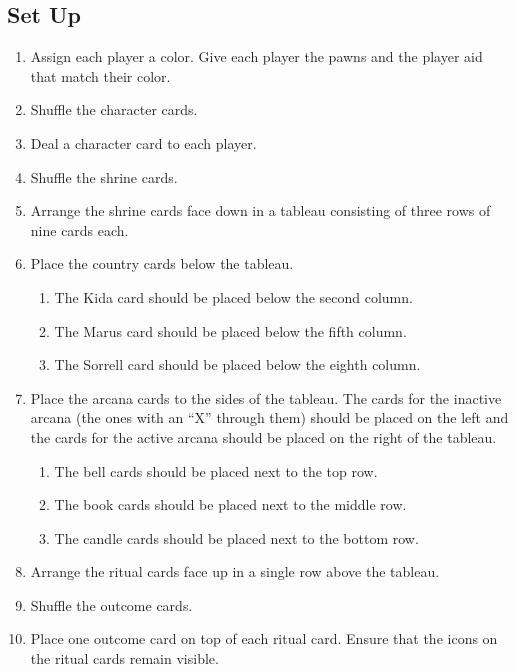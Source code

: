 \documentclass[10pt, parskip=half-, twoside]{scrartcl}
\begin{document}
\subsection*{Set Up}
\begin{enumerate}[itemindent=*, leftmargin=*]
	\item Assign each player a color. Give each player the pawns and the player aid that match their color.
	\item Shuffle the character cards.
	\item Deal a character card to each player.

	\item Shuffle the shrine cards.
	\item Arrange the shrine cards face down in a tableau consisting of three rows of nine cards each.
	\item Place the country cards below the tableau.
	\begin{enumerate}[itemindent=*, leftmargin=*]
		\item The Kida card should be placed below the second column.
		\item The Marus card should be placed below the fifth column.
		\item The Sorrell card should be placed below the eighth column.
	\end{enumerate}
	\item Place the arcana cards to the sides of the tableau. The cards for the inactive arcana (the ones with an ``X'' through them) should be placed on the left and the cards for the active arcana should be placed on the right of the tableau.
	\begin{enumerate}[itemindent=*, leftmargin=*]
		\item The bell cards should be placed next to the top row.
		\item The book cards should be placed next to the middle row.
		\item The candle cards should be placed next to the bottom row.
	\end{enumerate}
	\item Arrange the ritual cards face up in a single row above the tableau.
	\item Shuffle the outcome cards.
	\item Place one outcome card on top of each ritual card. Ensure that the icons on the ritual cards remain visible.
\end{enumerate}

\newpage
\end{document}
